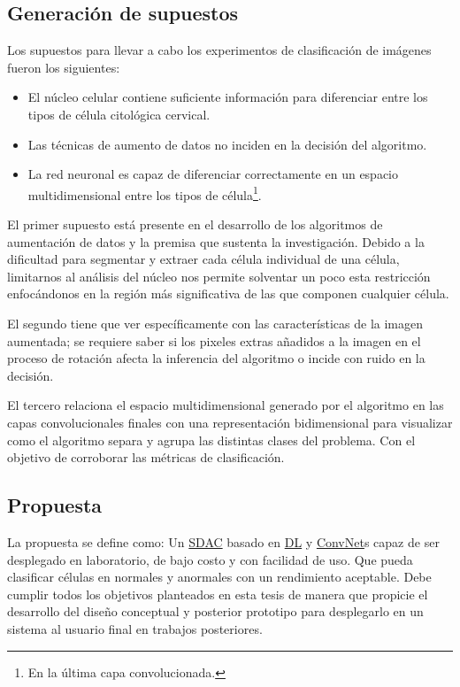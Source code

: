 \subsection{Generación de supuestos}

Los supuestos para llevar a cabo los experimentos de clasificación de imágenes
fueron los siguientes:

\begin{itemize}
  \item El núcleo celular contiene suficiente información para diferenciar entre
  los tipos de célula citológica cervical.
  \item Las técnicas de aumento de datos no inciden en la decisión del
  algoritmo.
  \item La red neuronal es capaz de diferenciar correctamente en un espacio
  multidimensional entre los tipos de célula\footnote{En la última capa
  convolucionada.}.
\end{itemize}

El primer supuesto está presente en el desarrollo de los algoritmos de
aumentación de datos y la premisa que sustenta la investigación. Debido a la
dificultad para segmentar y extraer cada célula individual de una célula,
limitarnos al análisis del núcleo nos permite solventar un poco esta restricción
enfocándonos en la región más significativa de las que componen cualquier
célula. 

El segundo tiene que ver específicamente con las características de la imagen
aumentada; se requiere saber si los pixeles extras añadidos a la imagen en el
proceso de rotación afecta la inferencia del algoritmo o incide con ruido en la
decisión.

El tercero relaciona el espacio multidimensional generado por el algoritmo en
las capas convolucionales finales con una representación bidimensional para
visualizar como el algoritmo separa y agrupa las distintas clases del problema.
Con el objetivo de corroborar las métricas de clasificación.

\subsection{Propuesta}

La propuesta se define como: Un \hyperlink{abbr}{SDAC} basado en
\hyperlink{abbr}{DL} y \hyperlink{abbr}{ConvNet}s capaz de ser desplegado en
laboratorio, de bajo costo y con facilidad de uso. Que pueda clasificar células
en normales y anormales con un rendimiento aceptable. Debe cumplir todos los
objetivos planteados en esta tesis de manera que propicie el desarrollo del
diseño conceptual y posterior prototipo para desplegarlo en un sistema al
usuario final en trabajos posteriores.
